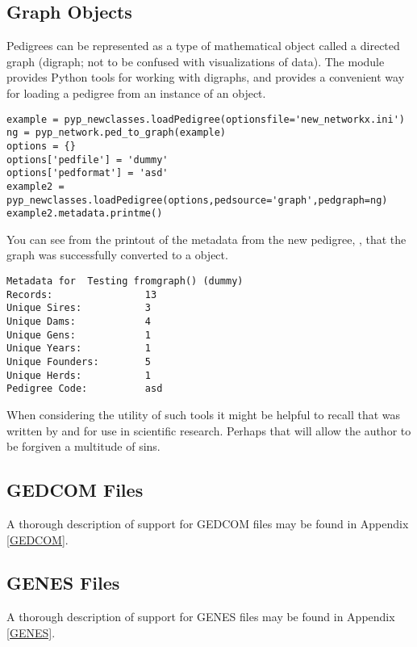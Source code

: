 \subsection{Graph Objects}\label{sec:io-input-xdigraph}
Pedigrees can be represented as a type of mathematical object called a directed graph (digraph; not to be confused with visualizations of data). The  module provides Python tools for working with digraphs, and \PyPedal{} provides a convenient way for loading a pedigree from an instance of an  object.
\begin{verbatim}
example = pyp_newclasses.loadPedigree(optionsfile='new_networkx.ini')
ng = pyp_network.ped_to_graph(example)
options = {}
options['pedfile'] = 'dummy'
options['pedformat'] = 'asd'
example2 = pyp_newclasses.loadPedigree(options,pedsource='graph',pedgraph=ng)
example2.metadata.printme()
\end{verbatim}
You can see from the printout of the metadata from the new pedigree, , that the graph  was successfully converted to a  object.
\begin{verbatim}
Metadata for  Testing fromgraph() (dummy)
Records:                13
Unique Sires:           3
Unique Dams:            4
Unique Gens:            1
Unique Years:           1
Unique Founders:        5
Unique Herds:           1
Pedigree Code:          asd
\end{verbatim}
When considering the utility of such tools it might be helpful to recall that \PyPedal{} was written by and for use in scientific research. Perhaps that will allow the author to be forgiven a multitude of sins.

\subsection{{GEDCOM} Files}\label{sec:io-input-gedcom}
A thorough description of support for {GEDCOM} files may be found in Appendix \ref{GEDCOM}.

\subsection{{GENES} Files}\label{sec:io-input-genes}
A thorough description of support for {GENES} files may be found in Appendix \ref{GENES}.

